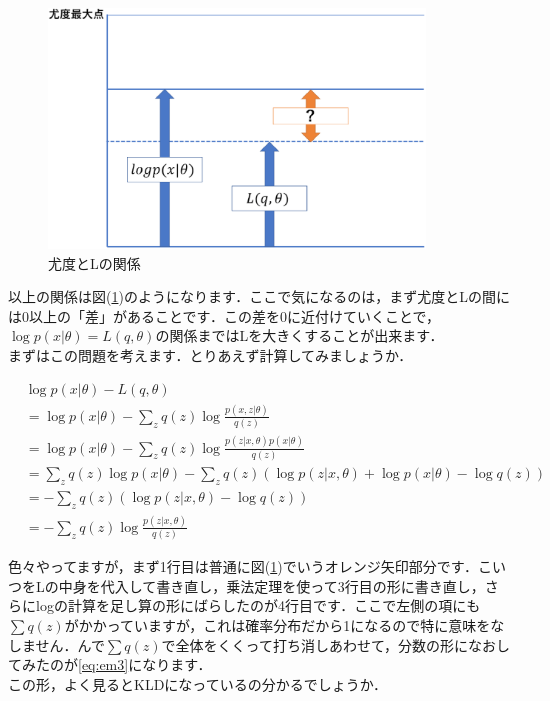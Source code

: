 \documentclass[11pt,a4paper]{ujreport}
\begin{document}
\begin{figure}[H]
  \label{im:em1}
  \centering
  \includegraphics[width=10cm]{../figures/em1.eps}
  \caption{尤度とLの関係}
\end{figure}


以上の関係は図(\ref{im:em1})のようになります．ここで気になるのは，まず尤度とLの間には0以上の「差」があることです．この差を0に近付けていくことで，$\log p(x|\theta) = L(q,\theta)$の関係まではLを大きくすることが出来ます．\\

まずはこの問題を考えます．とりあえず計算してみましょうか．

\begin{align}
  &\log p(x|\theta) - L(q,\theta)\nonumber\\
  &=\log p(x|\theta) - \sum_z q(z) \log \frac{p(x,z|\theta)}{q(z)}\nonumber\\
  &=\log p(x|\theta) - \sum_z q(z) \log \frac{p(z|x,\theta)p(x|\theta)}{q(z)}\nonumber\\
  &=\sum_z q(z) \log p(x|\theta) - \sum_z q(z)(\log p(z|x,\theta)+\log p(x|\theta) -\log q(z))\nonumber\\
  &=-\sum_z q(z)(\log p(z|x,\theta) - \log q(z))\nonumber\\
  &=-\sum_z q(z) \log \frac{p(z|x,\theta)}{q(z)}
  \label{eq:em3}
\end{align}

色々やってますが，まず1行目は普通に図(\ref{im:em1})でいうオレンジ矢印部分です．こいつをLの中身を代入して書き直し，乗法定理を使って3行目の形に書き直し，さらにlogの計算を足し算の形にばらしたのが4行目です．ここで左側の項にも$\sum q(z)$がかかっていますが，これは確率分布だから1になるので特に意味をなしません．んで$\sum q(z)$で全体をくくって打ち消しあわせて，分数の形になおしてみたのが\ref{eq:em3}になります．\\

この形，よく見るとKLDになっているの分かるでしょうか．
\end{document}
